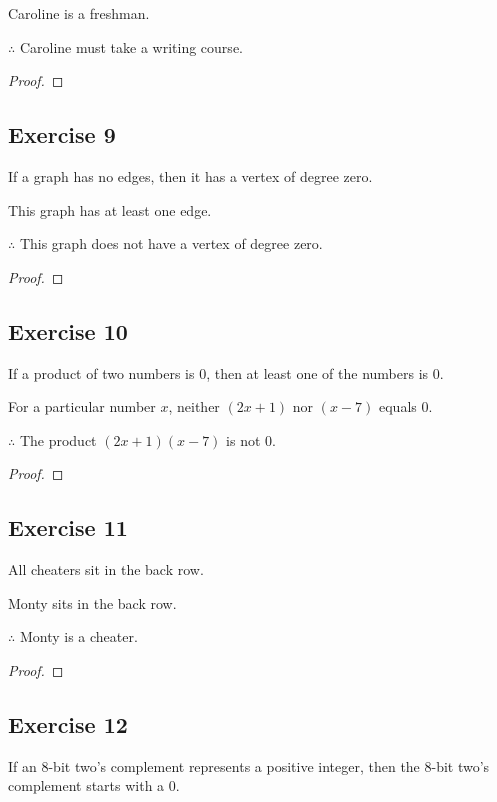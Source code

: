 \documentclass[14pt]{extarticle}
\begin{document}
Caroline is a freshman.

$\therefore$ Caroline must take a writing course.

\begin{proof}

\end{proof}

\subsection{Exercise 9}
If a graph has no edges, then it has a vertex of degree zero.

This graph has at least one edge.

$\therefore$ This graph does not have a vertex of degree zero.

\begin{proof}

\end{proof}

\subsection{Exercise 10}
If a product of two numbers is 0, then at least one of the numbers is 0.

For a particular number $x$, neither $(2x + 1)$ nor $(x - 7)$ equals 0.

$\therefore$ The product $(2x + 1)(x - 7)$ is not 0.

\begin{proof}

\end{proof}

\subsection{Exercise 11}
All cheaters sit in the back row. 

Monty sits in the back row.

$\therefore$ Monty is a cheater.

\begin{proof}

\end{proof}

\subsection{Exercise 12}
If an 8-bit two’s complement represents a positive integer, then the 8-bit two’s complement starts with a 0.
\end{document}
